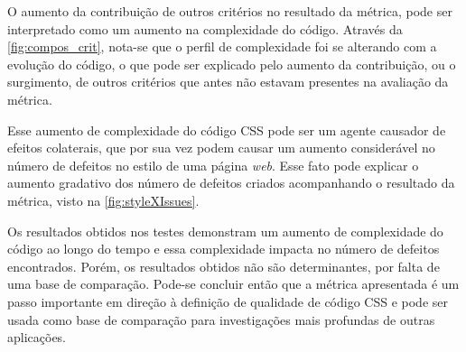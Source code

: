 O aumento da contribuição de outros critérios no resultado da métrica, pode ser interpretado como um aumento na complexidade do código.  Através da \autoref{fig:compos_crit}, nota-se que o perfil de complexidade foi se alterando com a evolução do código, o que pode ser explicado pelo aumento da contribuição, ou o surgimento, de outros critérios que antes não estavam presentes na avaliação da métrica.

Esse aumento de complexidade do código CSS pode ser um agente causador de efeitos colaterais, que por sua vez podem causar um aumento considerável no número de defeitos no estilo de uma página \textit{web}. Esse fato pode explicar o aumento gradativo dos número de defeitos criados acompanhando o resultado da métrica, visto na \autoref{fig:styleXIssues}.

Os resultados obtidos nos testes demonstram um aumento de complexidade do código ao longo do tempo e essa complexidade impacta no número de defeitos encontrados. Porém, os resultados obtidos não são determinantes, por falta de uma base de comparação. Pode-se concluir então que a métrica apresentada é um passo importante em direção à definição de qualidade de código CSS e pode ser usada como base de comparação para investigações mais profundas de outras aplicações.